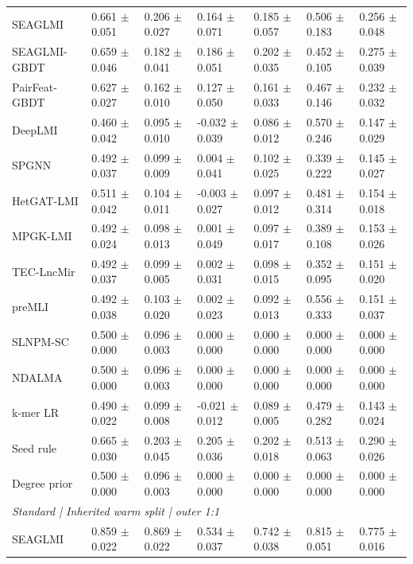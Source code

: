\begin{landscape}
{\begin{longtable}{lllllll}
SEAGLMI & 0.661 $\pm$ 0.051 & 0.206 $\pm$ 0.027 & 0.164 $\pm$ 0.071 & 0.185 $\pm$ 0.057 & 0.506 $\pm$ 0.183 & 0.256 $\pm$ 0.048 \\
SEAGLMI-GBDT & 0.659 $\pm$ 0.046 & 0.182 $\pm$ 0.041 & 0.186 $\pm$ 0.051 & 0.202 $\pm$ 0.035 & 0.452 $\pm$ 0.105 & 0.275 $\pm$ 0.039 \\
PairFeat-GBDT & 0.627 $\pm$ 0.027 & 0.162 $\pm$ 0.010 & 0.127 $\pm$ 0.050 & 0.161 $\pm$ 0.033 & 0.467 $\pm$ 0.146 & 0.232 $\pm$ 0.032 \\
DeepLMI & 0.460 $\pm$ 0.042 & 0.095 $\pm$ 0.010 & -0.032 $\pm$ 0.039 & 0.086 $\pm$ 0.012 & 0.570 $\pm$ 0.246 & 0.147 $\pm$ 0.029 \\
SPGNN & 0.492 $\pm$ 0.037 & 0.099 $\pm$ 0.009 & 0.004 $\pm$ 0.041 & 0.102 $\pm$ 0.025 & 0.339 $\pm$ 0.222 & 0.145 $\pm$ 0.027 \\
HetGAT-LMI & 0.511 $\pm$ 0.042 & 0.104 $\pm$ 0.011 & -0.003 $\pm$ 0.027 & 0.097 $\pm$ 0.012 & 0.481 $\pm$ 0.314 & 0.154 $\pm$ 0.018 \\
MPGK-LMI & 0.492 $\pm$ 0.024 & 0.098 $\pm$ 0.013 & 0.001 $\pm$ 0.049 & 0.097 $\pm$ 0.017 & 0.389 $\pm$ 0.108 & 0.153 $\pm$ 0.026 \\
TEC-LncMir & 0.492 $\pm$ 0.037 & 0.099 $\pm$ 0.005 & 0.002 $\pm$ 0.031 & 0.098 $\pm$ 0.015 & 0.352 $\pm$ 0.095 & 0.151 $\pm$ 0.020 \\
preMLI & 0.492 $\pm$ 0.038 & 0.103 $\pm$ 0.020 & 0.002 $\pm$ 0.023 & 0.092 $\pm$ 0.013 & 0.556 $\pm$ 0.333 & 0.151 $\pm$ 0.037 \\
SLNPM-SC & 0.500 $\pm$ 0.000 & 0.096 $\pm$ 0.003 & 0.000 $\pm$ 0.000 & 0.000 $\pm$ 0.000 & 0.000 $\pm$ 0.000 & 0.000 $\pm$ 0.000 \\
NDALMA & 0.500 $\pm$ 0.000 & 0.096 $\pm$ 0.003 & 0.000 $\pm$ 0.000 & 0.000 $\pm$ 0.000 & 0.000 $\pm$ 0.000 & 0.000 $\pm$ 0.000 \\
k-mer LR & 0.490 $\pm$ 0.022 & 0.099 $\pm$ 0.008 & -0.021 $\pm$ 0.012 & 0.089 $\pm$ 0.005 & 0.479 $\pm$ 0.282 & 0.143 $\pm$ 0.024 \\
Seed rule & 0.665 $\pm$ 0.030 & 0.203 $\pm$ 0.045 & 0.205 $\pm$ 0.036 & 0.202 $\pm$ 0.018 & 0.513 $\pm$ 0.063 & 0.290 $\pm$ 0.026 \\
Degree prior & 0.500 $\pm$ 0.000 & 0.096 $\pm$ 0.003 & 0.000 $\pm$ 0.000 & 0.000 $\pm$ 0.000 & 0.000 $\pm$ 0.000 & 0.000 $\pm$ 0.000 \\
\multicolumn{7}{l}{\textit{Standard | Inherited warm split | outer 1:1}}\\
SEAGLMI & 0.859 $\pm$ 0.022 & 0.869 $\pm$ 0.022 & 0.534 $\pm$ 0.037 & 0.742 $\pm$ 0.038 & 0.815 $\pm$ 0.051 & 0.775 $\pm$ 0.016 \\

\end{longtable}}
\end{landscape}
